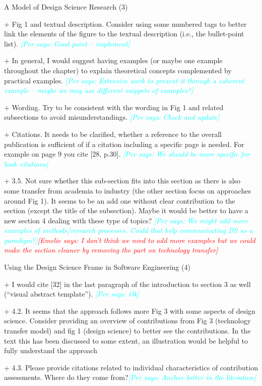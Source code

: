 \documentclass{article}
\newcommand{\emelie}[1]{\textcolor{red}{{\it [Emelie says: #1]}}}
\newcommand{\per}[1]{\textcolor{cyan}{{\it [Per says: #1]}}}
\newcommand{\emelie}[1]{}
\newcommand{\per}[1]{}
\begin{document}
A Model of Design Science Research (3)

+ Fig 1 and textual description. Consider using some numbered tags to better link the elements of the figure to the textual description (i.e., the bullet-point list). \per{Good point -- implement}

+ In general, I would suggest having examples (or maybe one example throughout the chapter) to explain theoretical concepts complemented by practical examples. \per{Extensive work to present it through a coherent example -- maybe we may use different snippets of examples?}

+ Wording. Try to be consistent with the wording in Fig 1 and related subsections to avoid misunderstandings. \per{Check and update}

+ Citations. It needs to be clarified, whether a reference to the overall publication is sufficient of if a citation including a specific page is needed. For example on page 9 you cite [28, p.30]. \per{We should be more specific for book citations}

+ 3.5. Not sure whether this sub-section fits into this section as there is also some transfer from academia to industry (the other section focus on approaches around Fig 1). It seems to be an add one without clear contribution to the section (except the title of the subsection). Maybe it would be better to have a new section 4 dealing with these type of topics? \per{We might add more examples of methods/research processes. Could that help communicating DS as a paradigm?}\emelie{I don't think we need to add more examples but we could make the section cleaner by removing the part on technology transfer}


Using the Design Science Frame in Software Engineering (4)

+ I would cite [32] in the last paragraph of the introduction to section 3 as well (“visual abstract template”). \per{Ok}

+ 4.2. It seems that the approach follows more Fig 3 with some aspects of design science. Consider providing an overview of contributions from Fig 3 (technology transfer model) and fig 1 (design science) to better see the contributions. In the text this has been discussed to some extent, an illustration would be helpful to fully understand the approach

+ 4.3. Please provide citations related to individual characteristics of contribution assessments. Where do they come from?\per{Anchor better in the literature}
\end{document}
